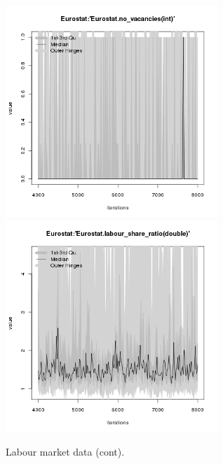 \begin{figure}[H!]
\centering\leavevmode
\begin{minipage}{17cm}
\centering\leavevmode
\includegraphics[width=8cm]{./png/tax_0.05/Eurostat-no_vacancies.png}
\includegraphics[width=8cm]{./png/tax_0.05/Eurostat-labour_share_ratio.png}
\end{minipage}
\caption{Labour market data (cont).}
\label{Figure: Labour Market 2}
\end{figure}

\clearpage


